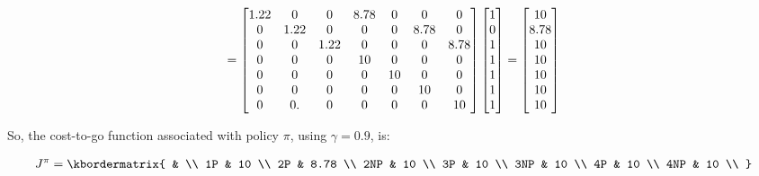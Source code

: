 \documentclass{article}
\begin{document}
\begin{equation}
    \notag
    = 
    \begin{bmatrix}
        1.22 & 0 & 0 & 8.78 & 0 & 0 & 0 \\ 
        0 & 1.22 & 0 & 0 & 0 & 8.78 & 0 \\ 
        0 & 0 & 1.22 & 0 & 0 & 0 & 8.78 \\
        0 & 0 & 0 & 10 & 0 & 0 & 0 \\  
        0 & 0 & 0 & 0 & 10 & 0 & 0 \\ 
        0 & 0 & 0 & 0 & 0 & 10 & 0 \\  
        0 & 0.& 0 & 0 & 0 & 0 & 10 \\
    \end{bmatrix}
    \begin{bmatrix}
        1 \\
        0 \\
        1 \\
        1 \\
        1 \\
        1 \\
        1 \\
    \end{bmatrix} = 
    \begin{bmatrix}
        10 \\
        8.78 \\
        10 \\
        10 \\
        10 \\
        10 \\
        10 \\
    \end{bmatrix}
\end{equation}

\medskip

So, the cost-to-go function associated with policy $\pi$, using $\gamma = 0.9$, is: 

\begin{equation}
    \notag
    J^\pi = 
    \kbordermatrix{
    & \\
    1P & 10 \\
    2P & 8.78 \\
    2NP & 10 \\
    3P & 10 \\
    3NP & 10 \\
    4P & 10 \\
    4NP & 10 \\
    }
\end{equation}
\end{document}
